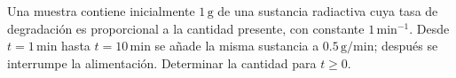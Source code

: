 Una muestra contiene inicialmente \(1\,\mathrm g\) de una sustancia radiactiva cuya tasa de degradación es proporcional a la cantidad presente, con constante \(1\,\mathrm{min^{-1}}\). Desde \(t=1\,\mathrm{min}\) hasta \(t=10\,\mathrm{min}\) se añade la misma sustancia a \(0.5\,\mathrm{g/min}\); después se interrumpe la alimentación. Determinar la cantidad para \(t\ge0\).
